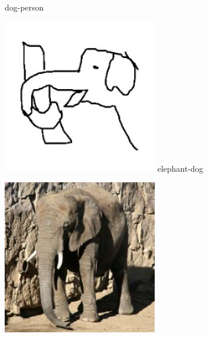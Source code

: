 \documentclass{article}
\begin{document}
\begin{center}
\begin{minipage}{0.142\textwidth}
        dog-person
    \end{minipage}%
    \begin{minipage}{0.142\textwidth}
        \includegraphics[width=\linewidth]{./pic/misclassified_r1_p0_2723.jpg}
        elephant-dog
    \end{minipage}%
    \begin{minipage}{0.142\textwidth}
        \includegraphics[width=\linewidth]{./pic/misclassified_r1_p2_2723.jpg}

\end{minipage}
\end{center}
\end{document}
